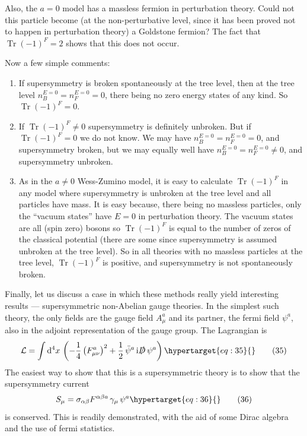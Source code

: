 \documentclass[11pt,a4paper]{article}
\newcommand{\eqtarget}[1]{\hypertarget{eq:#1}{\mathstrut}\tag{#1}}
\newcommand{\dd}{\mathop{}\!\mathrm{d}}
\newcommand{\ii}{\mathrm{i}}
\begin{document}
Also, the $a = 0$ model has a
massless fermion in perturbation
theory. Could not this particle become (at the non-perturbative
level, since it has been proved not to happen in perturbation theory)
a Goldstone fermion? The fact that $\operatorname{Tr}(-1)^F = 2$ shows that this does
not occur.

Now a few simple comments:
\begin{enumerate}[(1)]
\item If supersymmetry is broken spontaneously at the tree level,
then at the tree level $n_B^{E=0} = n_F^{E=0} = 0$, there being no zero energy
states of any kind. So $\operatorname{Tr}(-1)^F = 0$.

\item If $\operatorname{Tr}(-1)^F \neq 0$ supersymmetry is definitely unbroken. But
if $\operatorname{Tr}(-1)^F = 0$ we do not know. We may have $n_B^{E=0} = n_F^{E=0} = 0$, and
supersymmetry broken, but we may equally well have $n_B^{E=0} = n_F^{E=0} \neq 0$,
and supersymmetry unbroken.

\item As in the $a \neq 0$ Wess-Zumino model, it is easy to calculate
$\operatorname{Tr}(-1)^F$ in any model where supersymmetry is unbroken at the tree
level and all particles have mass. It is easy because, there being
no massless particles, only the ``vacuum states'' have $E = 0$ in perturbation
theory. The vacuum states are all (spin zero) bosons so
$\operatorname{Tr}(-1)^F$ is equal to the number of zeros of the classical potential
(there are some since supersymmetry is assumed unbroken at the tree
level). So in all theories with no massless particles at the tree
level, $\operatorname{Tr}(-1)^F$ is positive, and supersymmetry is not spontaneously
broken.
\end{enumerate}

Finally, let us discuss a case in which these methods really
yield interesting results --- supersymmetric non-Abelian gauge theories.
In the simplest such theory, the only fields are the gauge
field $A_\mu^a$ and its partner, the fermi field $\psi^a$, also in the adjoint
representation of the gauge group. The Lagrangian is
\begin{equation}
\mathcal{L} = \int \dd^4x\, \left(- \frac{1}{4}\left(F_{\mu\nu}^a\right)^2 + \frac{1}{2}\,\bar\psi^a\, \ii \slashed{D}\, \psi^a\right)
\eqtarget{35}
\end{equation}
The easiest way to show that this is a supersymmetric theory is to
show that the supersymmetry current
\begin{equation}
S_\mu = \sigma_{\alpha\beta} F^{\alpha\beta a}\, \gamma_\mu\, \psi^a
\eqtarget{36}
\end{equation}
is conserved. This is readily demonstrated, with the aid of some
Dirac algebra and the use of fermi statistics.
\end{document}
